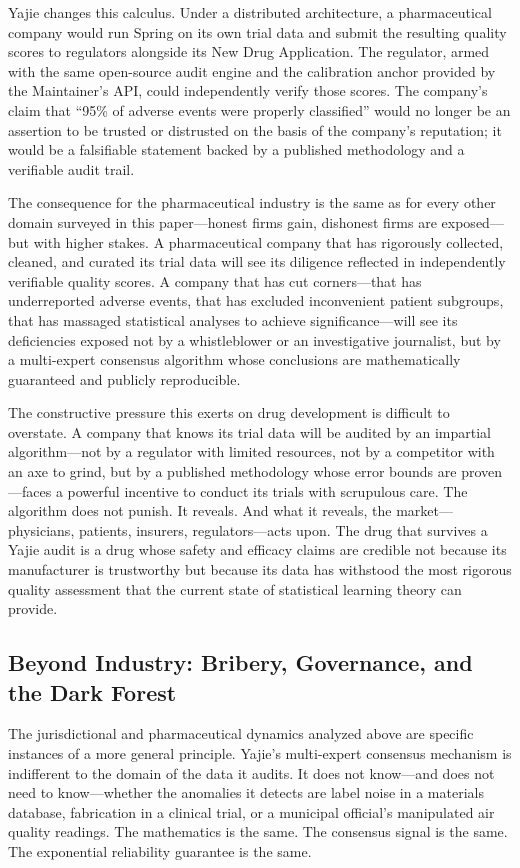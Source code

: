 \documentclass[12pt,a4paper]{ctexart}
\theoremstyle{definition}
\theoremstyle{remark}
\begin{document}
Yajie changes this calculus. Under a distributed architecture, a pharmaceutical company would run Spring on its own trial data and submit the resulting quality scores to regulators alongside its New Drug Application. The regulator, armed with the same open-source audit engine and the calibration anchor provided by the Maintainer's API, could independently verify those scores. The company's claim that ``95\% of adverse events were properly classified'' would no longer be an assertion to be trusted or distrusted on the basis of the company's reputation; it would be a falsifiable statement backed by a published methodology and a verifiable audit trail.

The consequence for the pharmaceutical industry is the same as for every other domain surveyed in this paper—honest firms gain, dishonest firms are exposed—but with higher stakes. A pharmaceutical company that has rigorously collected, cleaned, and curated its trial data will see its diligence reflected in independently verifiable quality scores. A company that has cut corners—that has underreported adverse events, that has excluded inconvenient patient subgroups, that has massaged statistical analyses to achieve significance—will see its deficiencies exposed not by a whistleblower or an investigative journalist, but by a multi-expert consensus algorithm whose conclusions are mathematically guaranteed and publicly reproducible.

The constructive pressure this exerts on drug development is difficult to overstate. A company that knows its trial data will be audited by an impartial algorithm—not by a regulator with limited resources, not by a competitor with an axe to grind, but by a published methodology whose error bounds are proven—faces a powerful incentive to conduct its trials with scrupulous care. The algorithm does not punish. It reveals. And what it reveals, the market—physicians, patients, insurers, regulators—acts upon. The drug that survives a Yajie audit is a drug whose safety and efficacy claims are credible not because its manufacturer is trustworthy but because its data has withstood the most rigorous quality assessment that the current state of statistical learning theory can provide.

\subsection{Beyond Industry: Bribery, Governance, and the Dark Forest}

The jurisdictional and pharmaceutical dynamics analyzed above are specific instances of a more general principle. Yajie's multi-expert consensus mechanism is indifferent to the domain of the data it audits. It does not know—and does not need to know—whether the anomalies it detects are label noise in a materials database, fabrication in a clinical trial, or a municipal official's manipulated air quality readings. The mathematics is the same. The consensus signal is the same. The exponential reliability guarantee is the same.
\end{document}
